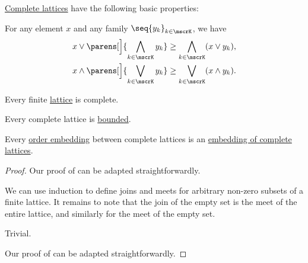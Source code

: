 \begin{proposition}\label{thm:def:complete_lattice}
  \hyperref[def:complete_lattice]{Complete lattices} have the following basic properties:
  \begin{thmenum}
     For any element \( x \) and any family \( \seq{ y_k }_{k \in \mscrK} \), we have
    \begin{subequations}
      \begin{align}
        x \vee \parens[\Big]{ \bigwedge_{k \in \mscrK} y_k } &\geq \bigwedge_{k \in \mscrK} (x \vee y_k), \label{eq:thm:def:complete_lattice/distributive_inequality/join_over_meet} \\
        x \wedge \parens[\Big]{ \bigvee_{k \in \mscrK} y_k } &\geq \bigvee_{k \in \mscrK} (x \wedge y_k). \label{eq:thm:def:complete_lattice/distributive_inequality/meet_over_join}
      \end{align}
    \end{subequations}

     Every finite \hyperref[def:lattice]{lattice} is complete.

     Every complete lattice is \hyperref[def:extremal_points/bounds]{bounded}.

     Every \hyperref[def:preordered_set/homomorphism]{order embedding} between complete lattices is an \hyperref[def:lattice/homomorphism]{embedding of complete lattices}.
  \end{thmenum}
\end{proposition}
\begin{proof}
   Our proof of  can be adapted straightforwardly.

   We can use induction to define joins and meets for arbitrary non-zero subsets of a finite lattice. It remains to note that the join of the empty set is the meet of the entire lattice, and similarly for the meet of the empty set.

   Trivial.

   Our proof of  can be adapted straightforwardly.
\end{proof}

